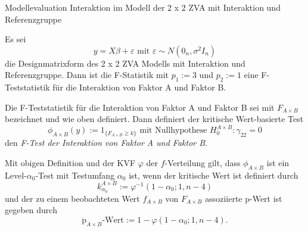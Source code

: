 \documentclass[
  8pt,
  ignorenonframetext,
]{beamer}
\begin{document}
\begin{frame}{\small Modellevaluation \textbar{} Interaktion im Modell
der 2 x 2 ZVA mit Interaktion und Referenzgruppe}
\protect\hypertarget{modellevaluation-interaktion-im-modell-der-2-x-2-zva-mit-interaktion-und-referenzgruppe}{}
\vspace{2mm}
\footnotesize
\begin{theorem}
\justifying
\normalfont
Es sei
\begin{equation}
y = X\beta + \varepsilon \mbox{ mit } \varepsilon \sim N(0_n,\sigma^2I_n)
\end{equation}
die Designmatrixform des 2 x 2 ZVA Modells mit Interaktion und Referenzgruppe. 
Dann ist die F-Statistik mit $p_1 := 3$ und $p_2 := 1$ eine F-Teststatistik für
die Interaktion von Faktor A und Faktor B.
\end{theorem}
\begin{definition}
\justifying
Die F-Teststatistik für die Interaktion von Faktor A und Faktor B sei mit $F_{A \times B}$
bezeichnet und wie oben definiert. Dann definiert der kritische Wert-basierte Test
\begin{equation}
\phi_{A\times B}(y) := 1_{\{F_{A \times B} \ge k\}} \mbox{ mit Nullhypothese } H_0^{A\times B} : \gamma_{22} = 0
\end{equation}
den \textit{F-Test der Interaktion von Faktor A und Faktor B}.
\end{definition}
\begin{theorem}
\justifying
\normalfont
Mit obigen Definition und der KVF $\varphi$ der $f$-Verteilung gilt, dass
$\phi_{A\times B}$ ist ein Level-$\alpha_0$-Test mit Testumfang $\alpha_0$ ist, 
wenn der kritische Wert ist definiert durch
\begin{equation}
k_{\alpha_0}^{A \times B} := \varphi^{-1}(1-\alpha_0; 1,n-4)
\end{equation}
und der zu einem beobachteten Wert $f_{A \times B}$ von $F_{A \times B}$ 
assoziierte p-Wert ist gegeben durch
\begin{equation}
\mbox{p}_{A \times B}\mbox{-Wert} := 1 - \varphi(1-\alpha_0; 1,n-4).
\end{equation}
\end{theorem}
\end{frame}
\end{document}
